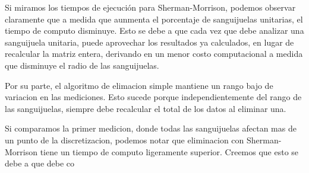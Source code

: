 Si miramos los tiempos de ejecución para Sherman-Morrison, podemos observar claramente que a medida que aunmenta el porcentaje de sanguijuelas unitarias, el tiempo de computo disminuye. Esto se debe a que cada vez que debe analizar una sanguijuela unitaria, puede aprovechar los resultados ya calculados, en lugar de recalcular la matriz entera, derivando en un menor costo computacional a medida que disminuye el radio de las sanguijuelas.

Por su parte, el algoritmo de elimacion simple mantiene un rango bajo de variacion en las mediciones. Esto sucede porque independientemente del rango de las sanguijuelas, siempre debe recalcular el total de los datos al eliminar una. 

Si comparamos la primer medicion, donde todas las sanguijuelas afectan mas de un punto de la discretizacion, podemos notar que eliminacion con Sherman-Morrison tiene un tiempo de computo ligeramente superior. Creemos que esto se debe a que debe co

